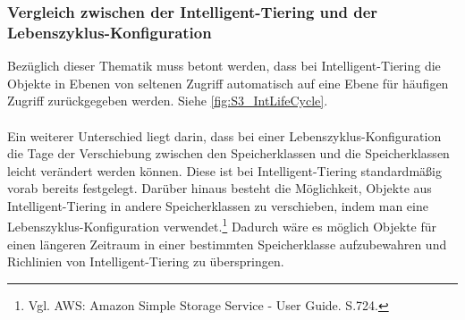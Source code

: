 \subsubsection*{Vergleich zwischen der Intelligent-Tiering und der Lebenszyklus-Konfiguration}%
Bezüglich dieser Thematik muss betont werden, dass bei Intelligent-Tiering die Objekte in Ebenen von seltenen Zugriff automatisch auf eine Ebene für häufigen Zugriff zurückgegeben werden. Siehe \autoref{fig:S3_IntLifeCycle}.
\\\\
Ein weiterer Unterschied liegt darin, dass bei einer Lebenszyklus-Konfiguration die Tage der Verschiebung zwischen den Speicherklassen und die Speicherklassen leicht verändert werden können. Diese ist bei Intelligent-Tiering standardmäßig vorab bereits festgelegt. %
Darüber hinaus besteht die Möglichkeit, Objekte aus Intelligent-Tiering in andere Speicherklassen zu verschieben, %
indem man eine Lebenszyklus-Konfiguration verwendet.\footnote{Vgl. AWS: Amazon Simple Storage Service - User Guide. S.724.\cite{AMZ18}} %
Dadurch wäre es möglich Objekte für einen längeren Zeitraum in einer bestimmten Speicherklasse aufzubewahren und Richlinien von Intelligent-Tiering zu überspringen.

